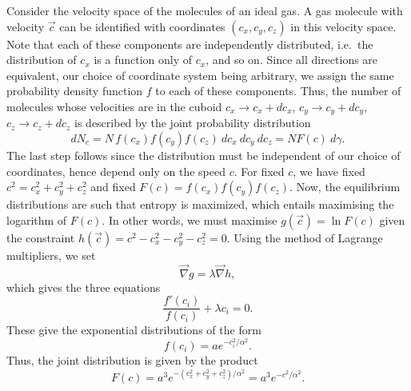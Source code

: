 \documentclass[11pt]{article}
\newcommand\ve[1]{\vec{#1}}
\newcommand\grad[1]{\ve{\nabla}#1}
\theoremstyle{definition}
\theoremstyle{remark}
\numberwithin{equation}{section}
\begin{document}
    Consider the velocity space of the molecules of an ideal gas. A gas molecule
    with velocity $\ve{c}$ can be identified with coordinates $(c_x, c_y, c_z)$ in
    this velocity space. Note that each of these components are independently
    distributed, i.e.\ the distribution of $c_x$ is a function only of $c_x$, and so
    on. Since all directions are equivalent, our choice of coordinate system being
    arbitrary, we assign the same probability density function $f$ to each of these
    components. Thus, the number of molecules whose velocities are in the cuboid
    $c_x \to c_x + dc_x$, $c_y \to c_y + dc_y$, $c_z \to c_z + dc_z$ is described by
    the joint probability distribution \[
        dN_c = N\, f(c_x)f(c_y)f(c_z)\:dc_x\:dc_y\:dc_z = N F(c)\:d\gamma.
    \] The last step follows since the distribution must be independent of our
    choice of coordinates, hence depend only on the speed $c$. For fixed $c$, we
    have fixed $c^2 = c_x^2 + c_y^2 + c_z^2$ and fixed $F(c) = f(c_x)f(c_y)f(c_z)$.
    Now, the equilibrium distributions are such that entropy is maximized, which
    entails maximising the logarithm of $F(c)$.  In other words, we must maximise
    $g(\vec{c}) = \ln{F(c)}$ given the constraint $h(\ve{c}) = c^2 - c_x^2 - c_y^2 -
    c_z^2 = 0$. Using the method of Lagrange multipliers, we set \[
        \grad{g} = \lambda \grad{h},
    \] which gives the three equations \[
        \frac{f'(c_i)}{f(c_i)} + \lambda c_i = 0.
    \] These give the exponential distributions of the form \[
        f(c_i) = a e^{-c_i^2 / \alpha^2}.
    \] Thus, the joint distribution is given by the product \[
        F(c) = a^3e^{-(c_x^2 + c_y^2 + c_z^2) /\alpha^2} = a^3e^{-c^2 / \alpha^2}.
    \] 
\end{document}
